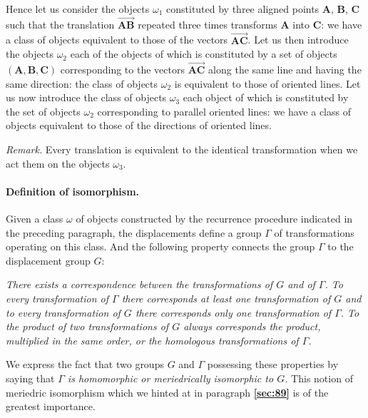 \documentclass[leqno,11pt]{book}
\numberwithin{equation}{chapter}
\theoremstyle{shape1}
\theoremstyle{shapesmall}
\newcommand{\fsref}[1]{{\rm\textsection\textbf{\ref{sec:#1}}}}
\newcommand{\somespace}{\vspace{9pt}}
\begin{document}
Hence let us consider the objects $\omega_{1}$ constituted by three aligned points $\mathbf{A}$, $\mathbf{B}$, $\mathbf{C}$ such that the translation $\overrightarrow{\mathbf{AB}}$ repeated three times transforms $\mathbf{A}$ into $\mathbf{C}$: we have a class of objects equivalent to those of the vectors $\overrightarrow{\mathbf{AC}}$. Let us then introduce the objects $\omega_{2}$ each of the objects of which is constituted by a set of objects $(\mathbf{A}, \mathbf{B}, \mathbf{C})$ corresponding to the vectors $\overrightarrow{\mathbf{AC}}$ along the same line and having the same direction: the class of objects $\omega_{2}$ is equivalent to those of oriented lines. Let us now introduce the class of objects $\omega_{3}$ each object of which is constituted by the set of objects $\omega_{2}$ corresponding to parallel oriented lines: we have a class of objects equivalent to those of the directions of oriented lines.

\somespace

\emph{Remark.} Every translation is equivalent to the identical transformation when we act them on the objects $\omega_{3}$.

\paragraph{Definition of isomorphism.}
\label{sec:90}
Given a class $\omega$ of objects constructed by the recurrence procedure indicated in the preceding paragraph, the displacements define a group $\Gamma$ of transformations operating on this class. And the following property connects the group $\Gamma$ to the displacement group $G$:

\somespace

\emph{There exists a correspondence between the transformations of $G$ and of $\Gamma$. To every transformation of $\Gamma$ there corresponds at least one transformation of $G$ and to every transformation of $G$ there corresponds only one transformation of $\Gamma$. To the product of two transformations of $G$ always corresponds the product, multiplied in the same order, or the homologous transformations of $\Gamma$.}

\somespace

We express  the fact that two groups $G$ and $\Gamma$ possessing these properties by saying that \emph{$\Gamma$ is homomorphic or meriedrically isomorphic to $G$.} This notion of meriedric isomorphism which we hinted at in paragraph \fsref{89} is of the greatest importance.
\end{document}
